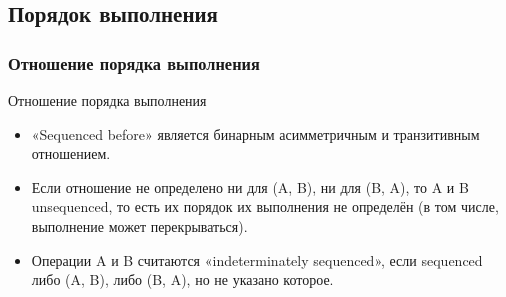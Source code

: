     \subsection{Порядок выполнения}
    \subsubsection{Отношение порядка выполнения}
    \begin{frame}{Отношение порядка выполнения}
        \begin{itemize}
            \item «Sequenced before» является бинарным асимметричным и транзитивным отношением.
            \item Если отношение не определено ни для (A, B), ни для (B, A), то A и B unsequenced,
                то есть их порядок их выполнения не определён (в том числе, выполнение может перекрываться).
            \item Операции A и B считаются «indeterminately sequenced», если sequenced либо (A, B), либо (B, A), но не указано которое.
        \end{itemize}
    \end{frame}

